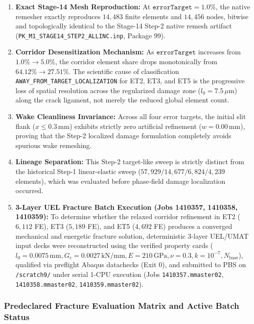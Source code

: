 \begin{enumerate}
  \item \textbf{Exact Stage-14 Mesh Reproduction:} At $\texttt{errorTarget} = 1.0\%$, the native remesher exactly reproduces $14{,}483$ finite elements and $14{,}456$ nodes, bitwise and topologically identical to the Stage-14 Step-2 native remesh artifact (\texttt{PK\_M1\_STAGE14\_STEP2\_ALLINC.inp}, Package 99).
  \item \textbf{Corridor Desensitization Mechanism:} As $\texttt{errorTarget}$ increases from $1.0\% \to 5.0\%$, the corridor element share drops monotonically from $64.12\% \to 27.51\%$. The scientific cause of classification \texttt{AWAY\_FROM\_TARGET\_LOCALIZATION} for ET2, ET3, and ET5 is the progressive loss of spatial resolution across the regularized damage zone ($l_0 = 7.5\,\mu\mathrm{m}$) along the crack ligament, not merely the reduced global element count.
  \item \textbf{Wake Cleanliness Invariance:} Across all four error targets, the initial slit flank ($x \le 0.3\,\mathrm{mm}$) exhibits strictly zero artificial refinement ($w = 0.00\,\mathrm{mm}$), proving that the Step-2 localized damage formulation completely avoids spurious wake remeshing.
  \item \textbf{Lineage Separation:} This Step-2 target-like sweep is strictly distinct from the historical Step-1 linear-elastic sweep ($57{,}929 / 14{,}677 / 6{,}824 / 4{,}239$ elements), which was evaluated before phase-field damage localization occurred.
  \item \textbf{3-Layer UEL Fracture Batch Execution (Jobs 1410357, 1410358, 1410359):} To determine whether the relaxed corridor refinement in ET2 ($6{,}112$ FE), ET3 ($5{,}189$ FE), and ET5 ($4{,}692$ FE) produces a converged mechanical and energetic fracture solution, deterministic 3-layer UEL/UMAT input decks were reconstructed using the verified property cards ($l_0=0.0075\,\mathrm{mm}, G_c=0.0027\,\mathrm{kN/mm}, E=210\,\mathrm{GPa}, \nu=0.3, k=10^{-7}, N_{\mathrm{base}}$), qualified via preflight Abaqus datachecks (Exit 0), and submitted to PBS on \texttt{/scratch9/} under serial 1-CPU execution (Jobs \texttt{1410357.mmaster02}, \texttt{1410358.mmaster02}, \texttt{1410359.mmaster02}).
\end{enumerate}



\subsubsection{Predeclared Fracture Evaluation Matrix and Active Batch Status}

